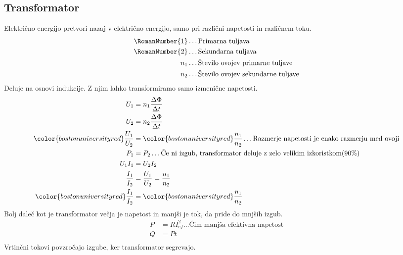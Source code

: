 {\color{indiagreen}\subsection{Transformator}}
Električno energijo pretvori nazaj v električno energijo, samo pri različni napetosti in različnem toku.\\
\begin{align*}
	\text{\RomanNumber{1}} &\dots \text{Primarna tuljava}\\
	\text{\RomanNumber{2}} &\dots \text{Sekundarna tuljava}\\
	n_1 &\dots \text{Število ovojev primarne tuljave}\\
	n_2 &\dots \text{Število ovojev sekundarne tuljave}\\
\end{align*}
Deluje na osnovi indukcije. Z njim lahko transformiramo samo izmenične napetosti.\\
\begin{align*}
	U_1 &= n_1 \frac{\Delta \Phi}{\Delta t}\\
	U_2 &= n_2 \frac{\Delta \Phi}{\Delta t}\\
	{\color{bostonuniversityred}\frac{U_1}{U_2}} &= {\color{bostonuniversityred}\frac{n_1}{n_2}} \dots \text{Razmerje napetosti je enako razmerju med ovoji}\\
	P_1 &= P_2 \dots \text{Če ni izgub, transformator deluje z zelo velikim izkoristkom(90\%)}\\
	U_1 I_1 &= U_2 I_2\\
	\frac{I_1}{I_2} &= \frac{U_1}{U_2} = \frac{n_1}{n_2}\\
	{\color{bostonuniversityred}\frac{I_1}{I_2}} &= {\color{bostonuniversityred}\frac{n_1}{n_2}}\\
\end{align*}
Bolj daleč kot je transformator večja je napetost in manjši je tok, da pride do mnjših izgub.\\
\begin{align*}
	P &= R I_{ef}^2 \dots \text{Čim manjša efektivna napetost}\\
	Q &= Pt\\
\end{align*}
{\color{bostonuniversityred}Vrtinčni tokovi} povzročajo izgube, ker transformator segrevajo.\\